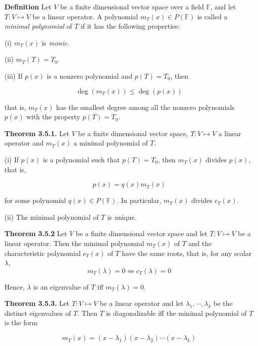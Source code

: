 \documentclass[10pt,landscape]{article}
\begin{document}
\begin{multicols}{4}
\textbf{Definition} Let $V$ be a finite dimensional vector space over a field $\mathbb{F}$, and let $T: V \mapsto V$ be a linear operator. A polynomial $m_T(x) \in P(\mathbb{F})$ is called a \textit{minimal polynomial} of $T$ if it has the following properties:

(i) $m_T(x)$ is \textit{monic}.

(ii) $m_T(T) = T_0$.

(iii) If $p(x)$ is a nonzero polynomial and $p(T) = T_0$, then 

$$
\deg (m_T(x)) \leq \deg (p(x))
$$

that is, $m_T(x)$ has the smallest degree among all the nonzero polynomials $p(x)$ with the property $p(T) = T_0$.

\textbf{Theorem 3.5.1.} Let $V$ be a finite dimensional vector space, $T: V \mapsto V$ a linear operator and $m_T(x)$ a minimal polynomial of $T$.

(i) If $p(x)$ is a polynomial such that $p(T) = T_0$, then $m_T(x)$ divides $p(x)$, that is, 

$$
p(x) = q(x) m_T(x)
$$

for some polynomial $q(x) \in P(\mathbb{F})$. In particular, $m_T(x)$ divides $c_T(x)$.

(ii) The minimal polynomial of $T$ is unique.

\textbf{Theorem 3.5.2} Let $V$ be a finite dimensional vector space and let $T: V \mapsto V$ be a linear operator. Then the minimal polynomial $m_T(x)$ of $T$ and the characteristic polynomial $c_T(x)$ of $T$ have the same roots, that is, for any scalar $\lambda$, 
$$
m_T(\lambda) = 0 \iff c_T(\lambda) = 0
$$

Hence, $\lambda$ is an eigenvalue of $T$ iff $m_T(\lambda) = 0$.

\textbf{Theorem 3.5.3.} Let $T: V \mapsto V$ be a linear operator and let $\lambda_1, \cdots, \lambda_k$ be the distinct eigenvalues of $T$. Then $T$ is diagonalizable iff the minimal polynomial of $T$ is the form 

$$
m_T(x) = (x - \lambda_1)(x - \lambda_2) \cdots (x - \lambda_k)
$$






\end{multicols}
\end{document}
